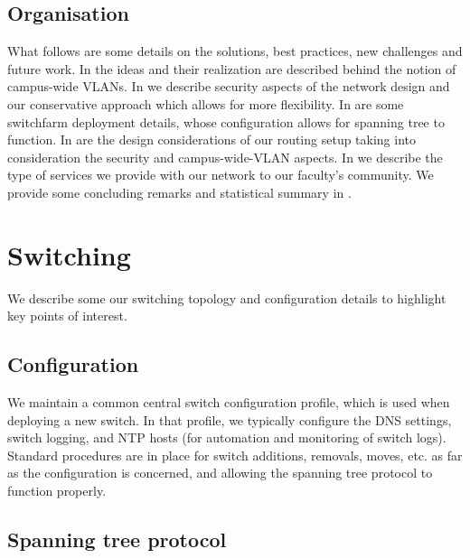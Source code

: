 \subsection{Organisation}

What follows are some details on the solutions, best practices, new
challenges and future work.
In  the ideas and their realization are described
behind the notion of campus-wide VLANs. 
In  we describe security aspects of the network design and
our conservative approach
which allows for more flexibility.
In  are some switchfarm deployment details,
whose configuration allows for spanning tree to function.
In  are the design considerations of our routing setup
taking into consideration the security and campus-wide-VLAN aspects.
In  we describe the type of services we provide with our network
to our faculty's community.
We provide some concluding remarks and statistical summary in .






\section{Switching}
\label{sect:switching}

We describe some our switching topology and configuration
details
to highlight key points of interest.


\subsection{Configuration}
\label{sect:switch-configuration}

We maintain a common central switch configuration profile, which is
used when deploying a new switch. In that profile, we typically configure the
DNS settings, switch logging, and NTP hosts (for automation and monitoring
of switch logs).
Standard procedures are in place for switch
additions, removals, moves, etc. as far as the configuration is concerned, and
allowing the spanning tree protocol to function properly.

\subsection{Spanning tree protocol}
\label{sect:spanning-tree}

